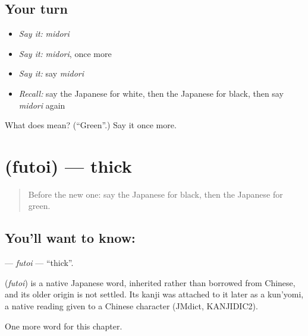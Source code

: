 \subsection*{Your turn}
\begin{itemize}
\raggedright
  \item \emph{Say it:} \emph{midori}
  \item \emph{Say it:} \emph{midori}, once more
  \item \emph{Say it:} say \emph{midori}
  \item \emph{Recall:} say the Japanese for white, then the Japanese for black, then say \emph{midori} again
\end{itemize}

\begin{tcolorbox}[breakable,colback=teal!4,colframe=teal!35!black,title={Before you move on}]
What does  mean? (\textquotedblleft{}Green\textquotedblright{}.) Say it once more.
\end{tcolorbox}
\section[\texorpdfstring{\ja{ふとい} (futoi)}{ふとい (futoi)}]{ (futoi) — thick}

\label{lesson:JA-C52-futoi}



\begin{quote}
Before the new one: say the Japanese for black, then the Japanese for green.
\end{quote}

\subsection*{You'll want to know: }
\textbf{} — \emph{futoi} — \textquotedblleft{}thick\textquotedblright{}.

\begin{cousinweb}
\textbf{} (\emph{futoi}) is a native Japanese word, inherited rather than borrowed from Chinese, and its older origin is not settled. Its kanji was attached to it later as a kun'yomi, a native reading given to a Chinese character (JMdict, KANJIDIC2).
\end{cousinweb}

\begin{grammarlens}[title={What you've built}]
One more word for this chapter.
\end{grammarlens}

